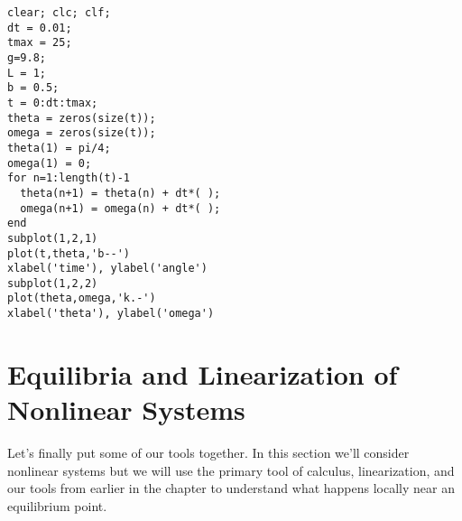\begin{lstlisting}
clear; clc; clf; 
dt = 0.01;
tmax = 25;
g=9.8;
L = 1;
b = 0.5;
t = 0:dt:tmax;
theta = zeros(size(t));
omega = zeros(size(t));
theta(1) = pi/4;
omega(1) = 0;
for n=1:length(t)-1
  theta(n+1) = theta(n) + dt*( );
  omega(n+1) = omega(n) + dt*( );
end
subplot(1,2,1)
plot(t,theta,'b--')
xlabel('time'), ylabel('angle')
subplot(1,2,2)
plot(theta,omega,'k.-')
xlabel('theta'), ylabel('omega')
\end{lstlisting}


% 


\newpage\section{Equilibria and Linearization of Nonlinear Systems}
Let's finally put some of our tools together.  In this section we'll consider nonlinear
systems but we will use the primary tool of calculus, linearization, and our tools from
earlier in the chapter to understand what happens locally near an equilibrium point.  

